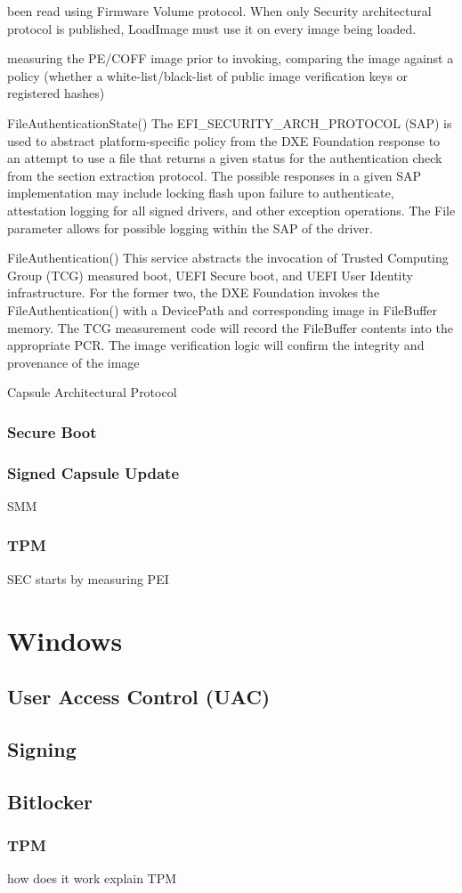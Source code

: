 been read using Firmware Volume protocol.
When only Security architectural protocol is published, LoadImage must use it on every image
being loaded.

measuring the PE/COFF image prior to invoking, comparing the
image against a policy (whether a white-list/black-list of public image verification keys or registered
hashes)

FileAuthenticationState()
The EFI_SECURITY_ARCH_PROTOCOL (SAP) is used to abstract platform-specific policy from
the DXE Foundation response to an attempt to use a file that returns a given status for the
authentication check from the section extraction protocol.
The possible responses in a given SAP implementation may include locking flash upon failure to
authenticate, attestation logging for all signed drivers, and other exception operations. The File
parameter allows for possible logging within the SAP of the driver.

FileAuthentication()
This service abstracts the invocation of Trusted Computing Group (TCG) measured boot, UEFI
Secure boot, and UEFI User Identity infrastructure. For the former two, the DXE Foundation
invokes the FileAuthentication() with a DevicePath and corresponding image in
FileBuffer memory. The TCG measurement code will record the FileBuffer contents into the
appropriate PCR. The image verification logic will confirm the integrity and provenance of the
image

Capsule Architectural Protocol

\subsubsection{Secure Boot}
\subsubsection{Signed Capsule Update}
SMM
\subsubsection{TPM}
SEC starts by measuring PEI

\section{Windows}
\subsection{User Access Control (UAC)}
\subsection{Signing}
\subsection{Bitlocker}
\subsubsection{TPM}
how does it work
explain TPM
